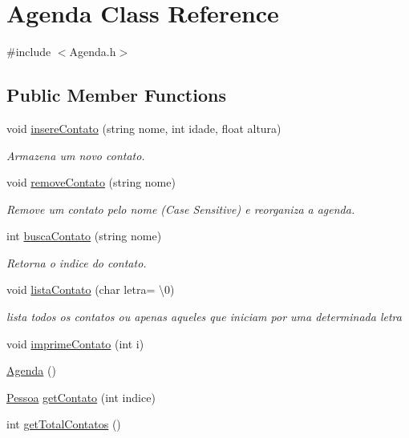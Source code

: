 \hypertarget{classAgenda}{}\section{Agenda Class Reference}
\label{classAgenda}


{\ttfamily \#include $<$Agenda.\+h$>$}

\subsection*{Public Member Functions}
\begin{DoxyCompactItemize}
\item 
void \hyperlink{classAgenda_ab222db5a8e3e0202d63f7a751175ea50}{insere\+Contato} (string nome, int idade, float altura)
\begin{DoxyCompactList}\small\item\em Armazena um novo contato. \end{DoxyCompactList}\item 
void \hyperlink{classAgenda_a7088190d93e67871f170659a1030c757}{remove\+Contato} (string nome)
\begin{DoxyCompactList}\small\item\em Remove um contato pelo nome (Case Sensitive) e reorganiza a agenda. \end{DoxyCompactList}\item 
int \hyperlink{classAgenda_aaa6fac2bbb2862a6ab4dce3d77ca63c6}{busca\+Contato} (string nome)
\begin{DoxyCompactList}\small\item\em Retorna o indice do contato. \end{DoxyCompactList}\item 
void \hyperlink{classAgenda_a79f206a17b36cfb5272063ac25973628}{lista\+Contato} (char letra= \textquotesingle{}\textbackslash{}0\textquotesingle{})
\begin{DoxyCompactList}\small\item\em lista todos os contatos ou apenas aqueles que iniciam por uma determinada letra \end{DoxyCompactList}\item 
void \hyperlink{classAgenda_adcc9683833a2ee94223d4cb94607f39d}{imprime\+Contato} (int i)
\item 
\hyperlink{classAgenda_a6685054d2b4ccbf2a4ef2ac5e3746bc3}{Agenda} ()
\item 
\hyperlink{classPessoa}{Pessoa} \hyperlink{classAgenda_a6a805cb0e712fee84e74c207d62dc378}{get\+Contato} (int indice)
\item 
int \hyperlink{classAgenda_aa9b2e02d34198613a9df81022149bdbb}{get\+Total\+Contatos} ()
\end{DoxyCompactItemize}



